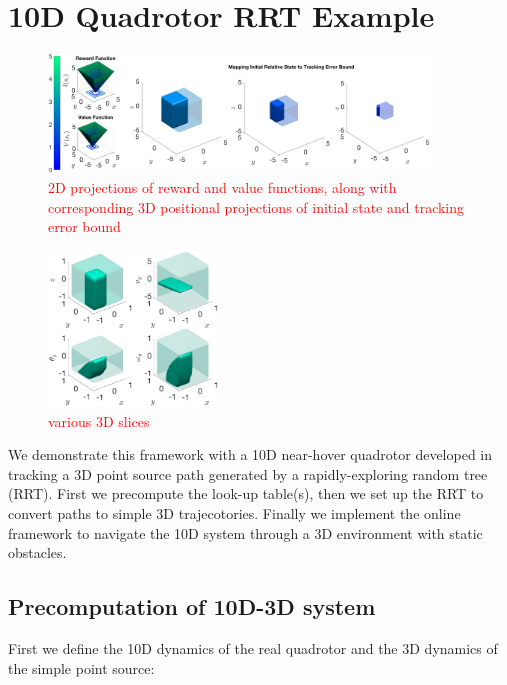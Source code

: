 \section{10D Quadrotor RRT Example \label{sec:results}}
\begin{figure}
	\centering
	\includegraphics[width=0.9\textwidth]{fig/quad10D_example_cost}
	\caption{\textcolor{red}{2D projections of reward and value functions, along with corresponding 3D positional projections of initial state and tracking error bound}}
	\label{fig:quad10D_example}
\end{figure} 

\begin{figure}
	\centering
	\includegraphics[width=0.4\textwidth]{fig/quad10D_slices}
	\caption{\textcolor{red}{various 3D slices}}
	\label{fig:quad10D_example}
\end{figure} 
We demonstrate this framework with a 10D near-hover quadrotor developed in \cite{Bouffard12} tracking a 3D point source path generated by a rapidly-exploring random tree (RRT). First we precompute the look-up table(s), then we set up the RRT to convert paths to simple 3D trajecotories. Finally we implement the online framework to navigate the 10D system through a 3D environment with static obstacles.

\subsection{Precomputation of 10D-3D system}
First we define the 10D dynamics of the real quadrotor and the 3D dynamics of the simple point source:


